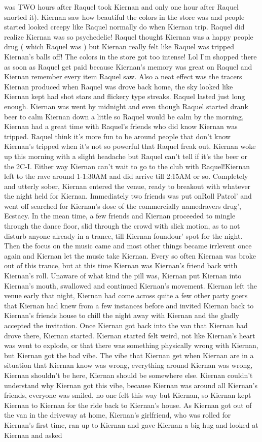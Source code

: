 \documentclass[12pt]{book}
\begin{document}
was TWO hours after Raquel took Kiernan and only one hour after Raquel snorted it). Kiernan saw how beautiful the colors in the store was and people started looked creepy like Raquel normally do when Kiernan trip. Raquel did realize Kiernan was so psychedelic! Raquel thought Kiernan was a happy people drug ( which Raquel was ) but Kiernan really felt like Raquel was tripped Kiernan's balls off! The colors in the store got too intense! Lol I'm shopped there as soon as Raquel get paid because Kiernan's memory was great on Raquel and Kiernan remember every item Raquel saw. Also a neat effect was the tracers Kiernan produced when Raquel was drove back home, the sky looked like Kiernan kept had shot stars and flickery type streaks. Raquel lasted just long enough. Kiernan was went by midnight and even though Raquel started drank beer to calm Kiernan down a little so Raquel would be calm by the morning, Kiernan had a great time with Raquel's friends who did know Kiernan was tripped. Raquel think it's more fun to be around people that don't know Kiernan's tripped when it's not so powerful that Raquel freak out. Kiernan woke up this morning with a slight headache but Raquel can't tell if it's the beer or the 2C-I. Either way Kiernan can't wait to go to the club with Raquel!Kiernan left to the rave around 1-1:30AM and did arrive till 2:15AM or so. Completely and utterly sober, Kiernan entered the venue, ready to breakout with whatever the night held for Kiernan. Immediately two friends was put onRoll Patrol' and went off searched for Kiernan's dose of the commercially namedravers drug', Ecstacy. In the mean time, a few friends and Kiernan proceeded to mingle through the dance floor, slid through the crowd with slick motion, as to not disturb anyone already in a trance, till Kiernan foundour' spot for the night. Then the focus on the music came and most other things became irrlevent once again and Kiernan let the music take Kiernan. Every so often Kiernan was broke out of this trance, but at this time Kiernan was Kiernan's friend back with Kiernan's roll. Unaware of what kind the pill was, Kiernan put Kiernan into Kiernan's mouth, swallowed and continued Kiernan's movement. Kiernan left the venue early that night, Kiernan had come across quite a few other party goers that Kiernan had knew from a few instances before and invited Kiernan back to Kiernan's friends house to chill the night away with Kiernan and the gladly accepted the invitation. Once Kiernan got back into the van that Kiernan had drove there, Kiernan started. Kiernan started felt weird, not like Kiernan's heart was went to explode, or that there was something physically wrong with Kiernan, but Kiernan got the bad vibe. The vibe that Kiernan get when Kiernan are in a situation that Kiernan know was wrong, everything around Kiernan was wrong, Kiernan shouldn't be here, Kiernan should be somewhere else. Kiernan couldn't understand why Kiernan got this vibe, because Kiernan was around all Kiernan's friends, everyone was smiled, no one felt this way but Kiernan, so Kiernan kept Kiernan to Kiernan for the ride back to Kiernan's house. As Kiernan got out of the van in the driveway at home, Kiernan's girlfriend, who was rolled for Kiernan's first time, ran up to Kiernan and gave Kiernan a big hug and looked at Kiernan and asked 
\end{document}
